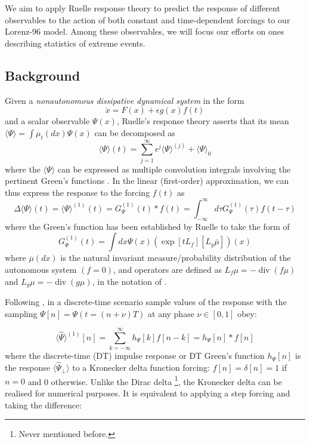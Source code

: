 \documentclass{article}
\begin{document}
We aim to apply Ruelle response theory \cite{Ruelle}\cite{Bodai} to predict the response of different observables to the action of both constant and time-dependent forcings to our Lorenz-96 model.
Among these observables, we will focus our efforts on ones describing statistics of extreme events.

\subsection{Background}

Given a \textit{nonautonomous dissipative dynamical system} in the form
\begin{equation}
\dot{x}=F(x)+\epsilon g(x) f(t)
\end{equation}
and a scalar observable $\Psi(x)$, Ruelle's response theory \cite{Ruelle} asserts that its mean $\langle\Psi\rangle=\int \mu_{t}(d x) \Psi(x)$ can be decomposed as
\begin{equation}
\langle\Psi\rangle(t)=\sum_{j=1}^{\infty} \epsilon^{j}\langle\Psi\rangle^{(j)} +\langle\Psi\rangle_{0}
\end{equation}
where the $\langle\Psi\rangle$ can be expressed as multiple convolution integrals involving the pertinent Green's functions \cite{LucariniClimateChange}. In the linear (first-order) approximation, we can thus express the response to the forcing $f(t)$ as
\begin{equation}
\Delta\langle\Psi\rangle(t)=\langle\Psi\rangle^{(1)}(t)=G_{\Psi}^{(1)}(t) * f(t)=\int_{-\infty}^{\infty} d \tau G_{\Psi}^{(1)}(\tau) f(t-\tau)
\end{equation}
where the Green's function has been established by Ruelle to take the form of
\begin{equation}
G_{\Psi}^{(1)}(t)=\int d x \Psi(x)\left(\exp \left[t L_{f}\right]\left[L_{g} \overline{\mu}\right]\right)(x)
\end{equation}
where $\overline{\mu}(d x)$ is the natural invariant measure/probability distribution of the autonomous system $(f = 0)$, and operators are defined as $L_{f} \mu=-\operatorname{div}(f \mu)$ and $L_{g} \mu=-\operatorname{div}(g \mu)$, in the notation of \cite{Abramov}.

Following \cite{Bodai}, in a discrete-time scenario sample values of the response with the sampling $\Psi[n]=\Psi(t=(n+\nu) T)$ at any phase $\nu \in[0,1]$ obey:

\begin{equation}
\langle\hat{\Psi}\rangle^{(1)}[n]=\sum_{k=-\infty}^{\infty} h_{\Psi}[k] f[n-k]=h_{\Psi}[n] * f[n]
\end{equation}
where the discrete-time (DT) impulse response or DT Green's function $h_{\Psi}[n]$ is the response $\langle\hat{\Psi}_{\perp}\rangle$ to a Kronecker delta function forcing: $f[n]=\delta[n]=1$ if $n=0$ and 0 otherwise. Unlike the Dirac delta \footnote{Never mentioned before.\label{fn8}}, the Kronecker delta can be realised for numerical purposes. It is equivalent to applying a step forcing and taking the difference: 
\end{document}
